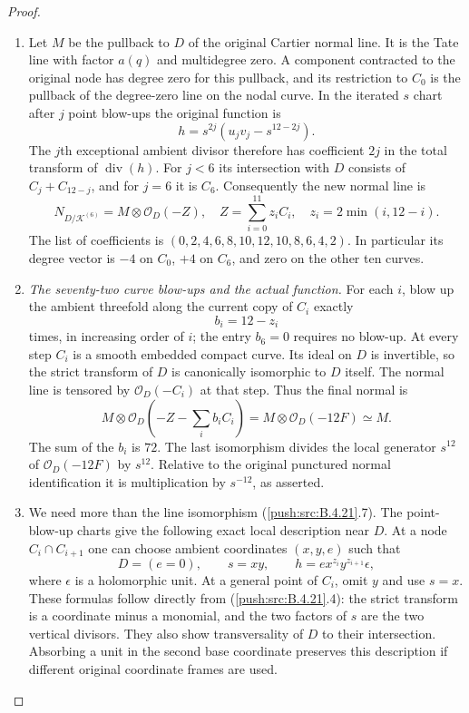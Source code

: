 \begin{proof}
\begin{enumerate}[label=\arabic*.,leftmargin=*]
\item Let $M$ be the pullback to $D$ of the original Cartier normal
line.  It is the Tate line with factor $a(q)$ and multidegree
zero.  A component contracted to the original node has degree
zero for this pullback, and its restriction to $C_0$ is the
pullback of the degree-zero line on the nodal curve.
In the iterated $s$ chart after $j$ point blow-ups the original
function is
\[
 h=s^{2j}(u_jv_j-s^{12-2j}).
\]
The $j$th exceptional ambient divisor therefore has coefficient
$2j$ in the total transform of $\operatorname{div}(h)$.
For $j<6$ its intersection with $D$ consists of
$C_j+C_{12-j}$, and for $j=6$ it is $C_6$.
Consequently the new normal line is
\[
 N_{D/\mathcal K^{(6)}}=M\otimes\mathcal O_D(-Z),
 \quad Z=\sum_{i=0}^{11}z_iC_i,
 \quad z_i=2\min(i,12-i).
 \tag{B.4.21.6}
\]
The list of coefficients is
$(0,2,4,6,8,10,12,10,8,6,4,2)$.
In particular its degree vector is $-4$ on $C_0$, $+4$ on
$C_6$, and zero on the other ten curves.

\item \emph{The seventy-two curve blow-ups and the actual function.}
For each $i$, blow up the ambient threefold along the current
copy of $C_i$ exactly
\[
 b_i=12-z_i
\]
times, in increasing order of $i$; the entry $b_6=0$ requires
no blow-up.  At every step $C_i$ is a smooth embedded compact
curve.  Its ideal on $D$ is invertible, so the strict transform
of $D$ is canonically isomorphic to $D$ itself.  The normal
line is tensored by $\mathcal O_D(-C_i)$ at that step.
Thus the final normal is
\[
 M\otimes\mathcal O_D(-Z-\textstyle\sum_i b_iC_i)
   =M\otimes\mathcal O_D(-12F)\simeq M.
 \tag{B.4.21.7}
\]
The sum of the $b_i$ is $72$.
The last isomorphism divides the local generator $s^{12}$
of $\mathcal O_D(-12F)$ by $s^{12}$.  Relative to the
original punctured normal identification it is multiplication
by $s^{-12}$, as asserted.

\item We need more than the line isomorphism (\ref{push:src:B.4.21}.7).
The point-blow-up charts give the following exact local
description near $D$.  At a node $C_i\cap C_{i+1}$ one can
choose ambient coordinates $(x,y,e)$ such that
\[
 D=(e=0),\qquad s=xy,\qquad
 h=e x^{z_i}y^{z_{i+1}}\epsilon,
 \tag{B.4.21.8}
\]
where $\epsilon$ is a holomorphic unit.  At a general point
of $C_i$, omit $y$ and use $s=x$.  These formulas follow
directly from (\ref{push:src:B.4.21}.4): the strict transform is a coordinate
minus a monomial, and the two factors of $s$ are the two
vertical divisors.  They also show transversality of $D$ to
their intersection.  Absorbing a unit in the second base
coordinate preserves this description if different original
coordinate frames are used.


\end{enumerate}
\end{proof}
